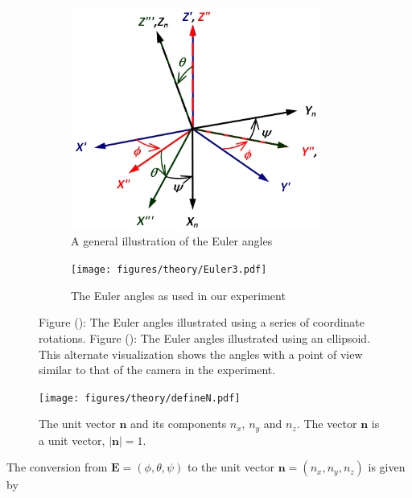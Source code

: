 \begin{figure}[H]
\centering
\begin{subfigure}[b]{0.45\textwidth}
\includegraphics[width=0.9\textwidth]{figures/theory/eulerangles.png}
\caption{A general illustration of the Euler angles}
\label{fig:eulerangles}
\end{subfigure}
\begin{subfigure}[b]{0.45\textwidth}
\texttt{[image: figures/theory/Euler3.pdf]}
\caption{The Euler angles as used in our experiment}
\label{fig:eulerparticle}
\end{subfigure}
\caption{Figure (): The Euler angles illustrated using a series of coordinate rotations. 
Figure (): The Euler angles illustrated using an ellipsoid. This alternate visualization shows the angles with a point of view similar to that of the camera in the experiment. }\label{fig:eulerplots}
\end{figure}


\begin{figure}[H]
\begin{center}
\texttt{[image: figures/theory/defineN.pdf]}
\end{center}
\caption{The unit vector $\mathbf{n}$ and its components $n_x$, $n_y$ and $n_z$. The vector $\mathbf{n}$ is a unit vector, $|\mathbf{n}| = 1$.}
\label{fig:nDef}
\end{figure}

The conversion from $\mathbf{E} = (\phi, \theta, \psi)$ to the unit vector $\mathbf{n} = (n_x, n_y, n_z)$ is given by 

